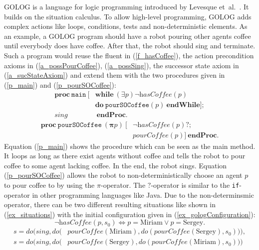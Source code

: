 GOLOG is a language for logic programming introduced by Levesque et~al.~\cite{levesque_golog:_1997}. It builds on the situation calculus. To allow high-level programming, GOLOG adds complex actions like loops, conditions, tests and non-deterministic elements. As an example, a GOLOG program should have a robot pouring other agents coffee until everybody does have coffee. After that, the robot should sing and terminate. Such a program would reuse the fluent in (\ref{f_hasCoffee}), the action precondition axioms in (\ref{a_possPourCoffee}), (\ref{a_possSing}), the successor state axiom in (\ref{a_sucStateAxiom}) and extend them with the two procedures given in (\ref{p_main}) and (\ref{p_pourSOCoffee}):
\begin{equation}\label{p_main}
  \begin{split}
    \textbf{proc}\ \texttt{main}\ [&\textbf{while}\ (\exists p) \neg\textit{hasCoffee}(p) \\
    &\textbf{do}\ \texttt{pourSOCoffee}(p)\ \textbf{endWhile}]; \\
    \textit{sing}&\ \textbf{endProc}.
  \end{split}
\end{equation}
\begin{equation}\label{p_pourSOCoffee}
  \begin{split}
    \textbf{proc}\ \texttt{pourSOCoffee}\ (\boldsymbol{\pi} p)\ [ &\neg\textit{hasCoffee}(p)\textbf{?}; \\
    &\textit{pourCoffee}(p)]\ \textbf{endProc}.
  \end{split}
\end{equation}
Equation (\ref{p_main}) shows the procedure which can be seen as the main method. It loops as long as there exist agents without coffee and tells the robot to pour coffee to some agent lacking coffee. In the end, the robot sings. Equation (\ref{p_pourSOCoffee}) allows the robot to non-deterministically choose an agent $p$ to pour coffee to by using the $\pi$-operator. The $?$-operator is similar to the \texttt{if}-operator in other programming languages like Java. Due to the non-determinsmic operator, there can be two different resulting situations like shown in (\ref{ex_situations}) with the initial configuration given in (\ref{ex_gologConfiguration}):
\begin{equation}\label{ex_gologConfiguration}
  \neg\textit{hasCoffee}(p,s_0) \Leftrightarrow p=\textrm{Miriam} \vee p=\textrm{Sergey}.
\end{equation}
\begin{equation}\label{ex_situations}
  \begin{split}
    s=\textit{do}\Big(\textit{sing},\textit{do}\big(&\textit{pourCoffee}(\textrm{Miriam}),
      \textit{do}(\textit{pourCoffee}(\textrm{Sergey}),s_0)\big)\Big),
\\  s=\textit{do}\Big(\textit{sing},\textit{do}\big(&\textit{pourCoffee}(\textrm{Sergey}),
      \textit{do}(\textit{pourCoffee}(\textrm{Miriam}),s_0)\big)\Big)
  \end{split}
\end{equation}

